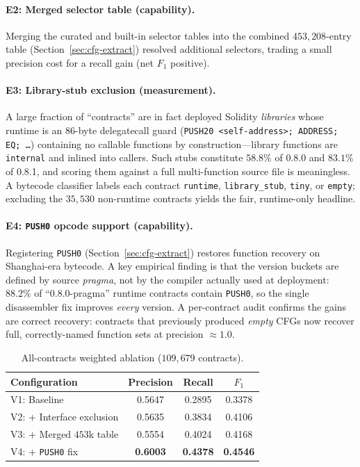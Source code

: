 \documentclass{stylefiles/capstone}
\begin{document}
\paragraph{E2: Merged selector table (capability).}
Merging the curated and built-in selector tables into the combined
$453{,}208$-entry table (Section~\ref{sec:cfg-extract}) resolved additional
selectors, trading a small precision cost for a recall gain (net $F_1$ positive).

\paragraph{E3: Library-stub exclusion (measurement).}
A large fraction of ``contracts'' are in fact deployed Solidity \emph{libraries}
whose runtime is an $86$-byte delegatecall guard
(\texttt{PUSH20 <self-address>; ADDRESS; EQ; \dots}) containing no callable
functions by construction—library functions are \texttt{internal} and inlined into
callers. Such stubs constitute $58.8\%$ of 0.8.0 and $83.1\%$ of 0.8.1, and
scoring them against a full multi-function source file is meaningless. A bytecode
classifier labels each contract \texttt{runtime}, \texttt{library\_stub},
\texttt{tiny}, or \texttt{empty}; excluding the $35{,}530$ non-runtime contracts
yields the fair, runtime-only headline.

\paragraph{E4: \texttt{PUSH0} opcode support (capability).}
Registering \texttt{PUSH0} (Section~\ref{sec:cfg-extract}) restores function
recovery on Shanghai-era bytecode. A key empirical finding is that the version
buckets are defined by source \emph{pragma}, not by the compiler actually used at
deployment: $88.2\%$ of ``0.8.0-pragma'' runtime contracts contain \texttt{PUSH0},
so the single disassembler fix improves \emph{every} version. A per-contract audit
confirms the gains are correct recovery: contracts that previously produced
\emph{empty} CFGs now recover full, correctly-named function sets at precision
$\approx 1.0$.

\begin{table}[t]
\centering
\caption{All-contracts weighted ablation ($109{,}679$ contracts).}
\label{tab:ablation-all}
\small
\begin{tabular}{l c c c}
\toprule
Configuration & Precision & Recall & $F_1$ \\
\midrule
V1: Baseline                    & 0.5647 & 0.2895 & 0.3378 \\
V2: + Interface exclusion       & 0.5635 & 0.3834 & 0.4106 \\
V3: + Merged $453$k table       & 0.5554 & 0.4024 & 0.4168 \\
V4: + \texttt{PUSH0} fix        & \textbf{0.6003} & \textbf{0.4378} & \textbf{0.4546} \\
\bottomrule
\end{tabular}
\end{table}
\end{document}
